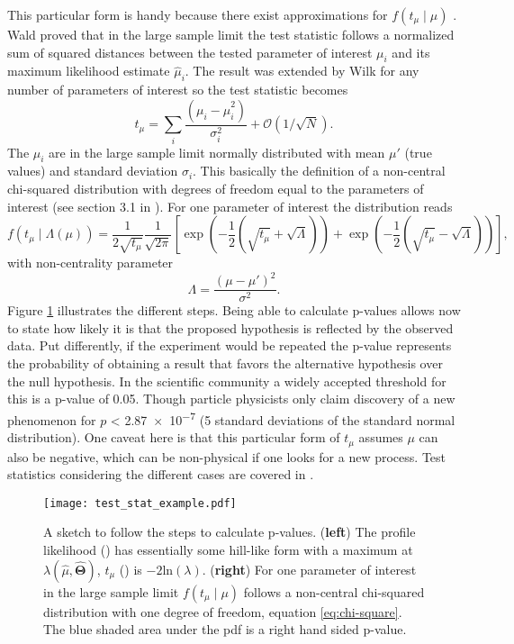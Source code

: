 This particular form is handy because there exist approximations for $f(t_\mu \mid \mu)$ \citep{cowan2011asymptotic}. Wald \citep{wald1943tests} proved that in the large sample limit the test statistic follows a normalized sum of squared distances between the tested parameter of interest $\mu_i$ and its maximum likelihood estimate $\hat{\mu}_i$. The result was extended by Wilk \citep{wilks1938large} for any number of parameters of interest so the test statistic becomes
\begin{equation}
    t_\mu=\sum_i \frac{(\mu_i-\hat{\mu}_i^2)}{\sigma_i^2} + \mathcal{O}(1/\sqrt{N}).
\end{equation}
The $\hat{\mu}_i$ are in the large sample limit normally distributed with mean $\mu'$ (true values) and standard deviation $\sigma_i$. This basically the definition of a non-central chi-squared distribution with degrees of freedom equal to the parameters of interest (see section 3.1 in \citep{cowan2011asymptotic}). For one parameter of interest the distribution reads
\begin{equation}\label{eq:chi-square}
    f(t_\mu \mid \Lambda(\mu))=\frac{1}{2\sqrt{t_\mu}}\frac{1}{\sqrt{2\pi}}
    \left[
\exp\left(-\frac{1}{2}\left(\sqrt{t_\mu}+\sqrt{\Lambda}\right)\right)
+
\exp\left(-\frac{1}{2}\left(\sqrt{t_\mu}-\sqrt{\Lambda}\right)\right)
\right],
\end{equation}
with non-centrality parameter 
\begin{equation}
    \Lambda=\frac{(\mu-\mu')^2}{\sigma^2}.
\end{equation}
Figure \ref{fig:test_stat_example} illustrates the different steps. Being able to calculate p-values allows now to state how likely it is that the proposed hypothesis is reflected by the observed data. Put differently, if the experiment would be repeated the p-value represents the probability of obtaining a result that favors the alternative hypothesis over the null hypothesis. In the scientific community a widely accepted threshold for this is a p-value of 0.05. Though particle physicists only claim discovery of a new phenomenon for $p$ < \SI{2.87e-7}{} (5 standard deviations of the standard normal distribution). One caveat here is that this particular form of $t_\mu$ assumes $\mu$ can also be negative, which can be non-physical if one looks for a new process. Test statistics considering the different cases are covered in \citep{cowan2011asymptotic}. 
\begin{figure}
    \centering
    \texttt{[image: test\_stat\_example.pdf]}
        \caption[]{A sketch to follow the steps to calculate p-values. (\textbf{left}) The profile likelihood () has essentially some hill-like form with a maximum at ${\lambda(\hat{\mu},\hat{\bm{\Theta}})}$, $t_\mu$ () is $-2\mathrm{ln}(\lambda)$. (\textbf{right}) For one parameter of interest in the large sample limit $f(t_\mu \mid \mu)$ follows a non-central chi-squared distribution with one degree of freedom, equation \ref{eq:chi-square}. The blue shaded area under the pdf is a right hand sided p-value.}
    \label{fig:test_stat_example}    
\end{figure}

